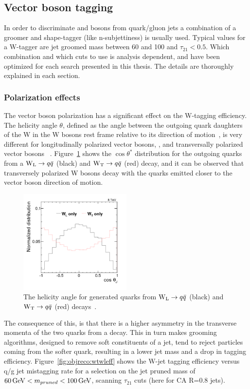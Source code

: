 \subsection{Vector boson tagging}
In order to discriminate \PW and \PZ bosons from quark/gluon jets a combination of a groomer and shape-tagger (like n-subjettiness) is usually used.
Typical values for a W-tagger are jet groomed mass between 60 and 100 \GeV and $\tau_{21}<0.5$.
Which combination and which cuts to use is analysis dependent, and have been optimized for each search presented in this thesis. The details are thoroughly explained in each section.


\subsubsection{Polarization effects}
\label{sec:objreco:pol}
The vector boson polarization has a significant effect on the W-tagging efficiency. The helicity angle $\theta$, defined as the angle between the outgoing quark daughters of the W in the W bosons rest frame relative to its direction of motion~\cite{PhysRevD.86.095031}, is very different for longitudinally polarized vector bosons, \PWL, and transversally polarized vector bosons \PWT ~\cite{Khachatryan:2014vla}. Figure~\ref{fig:objreco:wtwlcostheta} shows the $\cos \theta^*$ distribution for the outgoing quarks from a $\mathrm{W}_{\mathrm{L}} \rightarrow q \bar {q}$ (black) and $\mathrm{W}_{\mathrm{T}} \rightarrow q \bar{q}$ (red) decay, and it can be observed that transversely polarized W bosons decay with the quarks emitted closer to the vector boson direction of motion.
\begin{figure}[h] 
    \centering 
    \includegraphics[width=0.5\textwidth]{figures/event_reconstruction/cosThetaJJ_GEN.png}
     \caption{The helicity angle for generated quarks from $\mathrm{W}_{\mathrm{L}}\rightarrow q\bar{q}$ (black) and $\mathrm{W}_{\mathrm{T}}\rightarrow q\bar{q}$ (red) decays~\cite{Khachatryan:2014vla}.}
     \label{fig:objreco:wtwlcostheta}
 \end{figure}
The consequence of this, is that there is a higher asymmetry in the transverse momenta of the two quarks from a \PWT decay. This in turn makes grooming algorithms, designed to remove soft constituents of a jet, tend to reject particles coming from the softer quark, resulting in a lower jet mass and a drop in tagging efficiency. Figure~\ref{fig:objreco:wtwleff} shows the W-jet tagging efficiency versus q/g jet mistagging rate for a selection on the jet pruned mass of $60 \,\text{Ge\hspace{-.08em}V} < m_{pruned} < 100 \,\text{Ge\hspace{-.08em}V}$, scanning $\tau_{21}$ cuts (here for CA R=0.8 jets).

